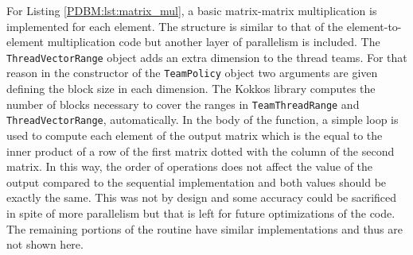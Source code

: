 \documentclass{ccr16}
\begin{document}
{{            

            For Listing \ref{PDBM:lst:matrix_mul}, a basic matrix-matrix multiplication is implemented for each element. The structure is similar to that of the element-to-element multiplication code but another layer of parallelism is included. The \texttt{ThreadVectorRange} object adds an extra dimension to the thread teams. For that reason in the constructor of the \texttt{TeamPolicy} object two arguments are given defining the block size in each dimension. The Kokkos library computes the number of blocks necessary to cover the ranges in \texttt{TeamThreadRange} and \texttt{ThreadVectorRange}, automatically. In the body of the function, a simple loop is used to compute each element of the output matrix which is the equal to the inner product of a row of the first matrix dotted with the column of the second matrix. In this way, the order of operations does not affect the value of the output compared to the sequential implementation and both values should be exactly the same. This was not by design and some accuracy could be sacrificed in spite of more parallelism but that is left for future optimizations of the code. The remaining portions of the routine have similar implementations and thus are not shown here.
        }
    }
\end{document}
